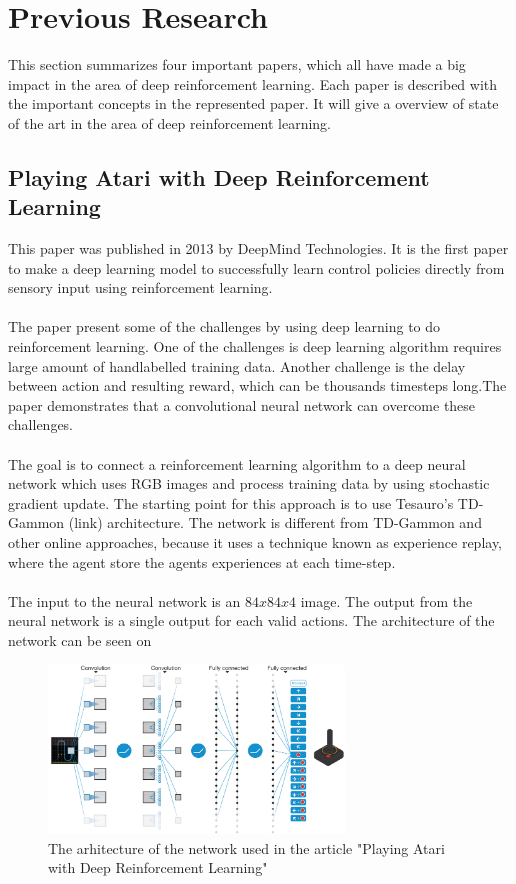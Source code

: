 \section{Previous Research}
\label{Previous_Research}
This section summarizes four important papers, which all have made a big impact in the area of deep reinforcement learning. Each paper is described with the important concepts in the represented paper. It will give a overview of state of the art in the area of deep reinforcement learning.   

\subsection{Playing Atari with Deep Reinforcement Learning}
This paper was published in 2013 by DeepMind Technologies. It is the first paper to make a deep learning model to successfully learn control policies directly from sensory input using reinforcement learning. 
\\
\\
The paper present some of the challenges by using deep learning to do reinforcement learning. One of the challenges is deep learning algorithm requires large amount of handlabelled training data. Another challenge is the delay between action and resulting reward, which can be thousands timesteps long.The paper demonstrates that a convolutional neural network can overcome these challenges. 
\\
\\
The goal is to connect a reinforcement learning algorithm to a deep neural network which uses RGB images and process training data by using stochastic gradient update. The starting point for this approach is to use Tesauro's TD-Gammon (link) architecture. The network is different from TD-Gammon and other online approaches, because it uses a technique known as experience replay, where the agent store the agents experiences at each time-step.
\\
\\
The input to the neural network is an $84 x 84 x 4$ image. The output from the neural network is a single output for each valid actions. The architecture of the network can be seen on    

\begin{figure}[H]
	\centering
	\includegraphics[width=0.7\textwidth]{Figures/TheoreticalBackground/playing_atari.jpg}
	\caption{The arhitecture of the network used in the article "Playing Atari with Deep Reinforcement Learning"}
	\label{fig:playing_atari}
\end{figure} 

